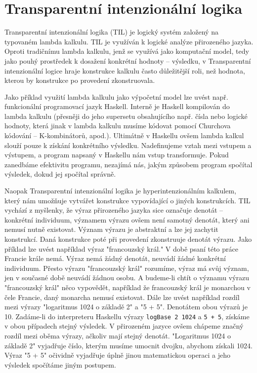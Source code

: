 \chapter{Transparentní intenzionální logika}
\label{sec:TILIntroduction}

Transparentní intenzionální logika (TIL) je logický systém založený na typovaném lambda kalkulu.
TIL je využíván k logické analýze přirozeného jazyka. Oproti tradičnímu lambda kalkulu, jenž
se využívá jako komputační model, tedy jako pouhý prostředek k dosažení konkrétní hodnoty --
výsledku, v Transparentní intenzionální logice hraje konstrukce kalkulu často důležitější roli,
než hodnota, kterou by konstrukce po provedení zkonstruovala.

Jako příklad využití lambda kalkulu jako výpočetní model lze uvést např. funkcionální programovací
jazyk Haskell. Interně je Haskell kompilován do lambda kalkulu (přesněji do jeho supersetu
obsahujícího např. čísla nebo logické hodnoty, která jinak v lambda kalkulu musíme kódovat pomocí
Churchova kódování -- K-kombinátorů, apod.). Ultimátně v Haskellu ovšem lambda kalkul slouží pouze
k získání konkrétního výsledku. Nadefinujeme vztah mezi vstupem a výstupem, a program napsaný
v Haskellu nám vstup transformuje. Pokud zanedbáme efektivitu programu, nezajímá nás, jakým
způsobem program spočítal výsledek, dokud jej spočítal správně.

Naopak Transparentní intenzionální logika je hyperintenzionálním kalkulem, který nám umožňuje
vytvářet konstrukce vypovídající o jiných konstrukcích. TIL vychází z myšlenky, že výraz
přirozeného jazyka sice označuje denotát -- konkrétní individuum, významem výrazu ovšem není
samotný denotát, který ani nemusí nutně existovat. Význam výrazu je abstraktní a lze jej zachytit
konstrukcí. Daná konstrukce poté při provedení zkonstruuje denotát výrazu. Jako příklad lze uvést
například výraz "francouzský král." V době psaní této práce Francie krále nemá. Výraz nemá žádný
denotát, neuvádí žádné konkrétní individuum. Přesto výrazu "francouzský král" rozumíme, výraz má
svůj význam, jen v současné době neuvádí žádnou osobu. A budeme-li chtít o významu výrazu
"francouzský král" něco vypovědět, například že francouzský král je monarchou v čele Francie,
daný monarcha nemusí existovat. Dále lze uvést například rozdíl mezi výrazy "logaritmus 1024
o základě 2" a "5 + 5". Denotátem obou výrazů je 10. Zadáme-li do interpreteru Haskellu výrazy
\lstset{language=Haskell}
\lstinline{logBase 2 1024} a \lstinline{5 + 5}, získáme v obou případech stejný výsledek.
V přirozeném jazyce ovšem chápeme značný rozdíl mezi oběma výrazy, ačkoliv mají stejný denotát.
"Logaritmus 1024 o základě 2" vyjadřuje číslo, kterým musíme umocnit dvojku, abychom získali 1024.
Výraz "5 + 5" očividně vyjadřuje úplně jinou matematickou operaci a jeho výsledek spočítáme jiným
postupem.


\begin{tikzpicture}
\end{tikzpicture}

\endinput
